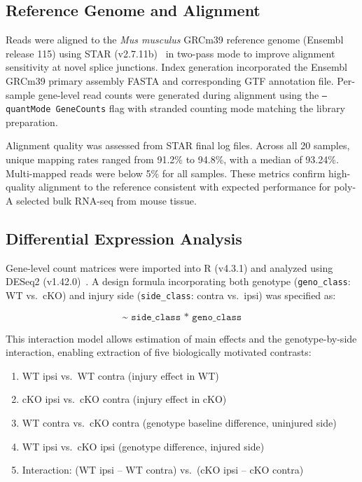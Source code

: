 \documentclass[conference]{IEEEtran}
\begin{document}
\subsection{Reference Genome and Alignment}

Reads were aligned to the \textit{Mus musculus} GRCm39 reference genome (Ensembl release 115) using STAR (v2.7.11b)~\cite{dobin2013} in two-pass mode to improve alignment sensitivity at novel splice junctions. Index generation incorporated the Ensembl GRCm39 primary assembly FASTA and corresponding GTF annotation file. Per-sample gene-level read counts were generated during alignment using the \texttt{--quantMode GeneCounts} flag with stranded counting mode matching the library preparation.

Alignment quality was assessed from STAR final log files. Across all 20 samples, unique mapping rates ranged from 91.2\% to 94.8\%, with a median of 93.24\%. Multi-mapped reads were below 5\% for all samples. These metrics confirm high-quality alignment to the reference consistent with expected performance for poly-A selected bulk RNA-seq from mouse tissue.

\subsection{Differential Expression Analysis}

Gene-level count matrices were imported into R (v4.3.1) and analyzed using DESeq2 (v1.42.0)~\cite{love2014}. A design formula incorporating both genotype (\texttt{geno\_class}: WT vs.\ cKO) and injury side (\texttt{side\_class}: contra vs.\ ipsi) was specified as:

\begin{equation}
  \texttt{\textasciitilde{} side\_class * geno\_class}
\end{equation}

This interaction model allows estimation of main effects and the genotype-by-side interaction, enabling extraction of five biologically motivated contrasts:

\begin{enumerate}
  \item WT ipsi vs.\ WT contra (injury effect in WT)
  \item cKO ipsi vs.\ cKO contra (injury effect in cKO)
  \item WT contra vs.\ cKO contra (genotype baseline difference, uninjured side)
  \item WT ipsi vs.\ cKO ipsi (genotype difference, injured side)
  \item Interaction: (WT ipsi -- WT contra) vs.\ (cKO ipsi -- cKO contra)
\end{enumerate}
\end{document}
